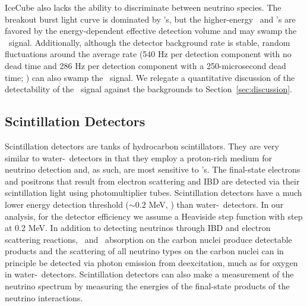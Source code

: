 IceCube also lacks the ability to discriminate between neutrino species.  The 
    breakout burst light curve is dominated by \nue's, but the higher-energy 
    \anue\ and \nux's are favored by the energy-dependent effective detection 
    volume and may swamp the \nue\ signal.  Additionally, although the detector 
    background rate is stable, random fluctuations around the average rate (540 Hz 
    per detection component with no dead time and 286 Hz per detection component 
    with a 250-microsecond dead time; \citealt{abbasietal2011}) can also swamp the 
    \nue\ signal.  We relegate a quantitative discussion of the detectability of 
    the \nue\ signal against the backgrounds to Section~\ref{sec:discussion}.


\subsection{Scintillation Detectors}
Scintillation detectors are tanks of hydrocarbon 
scintillators.  They are very similar to water-\cer\
detectors in that 
they employ a proton-rich medium for neutrino detection 
and, as such, are most sensitive  to
\anue's. The final-state electrons and positrons that result from
electron scattering and IBD are detected via their scintillation light
using photomultiplier tubes. 
 Scintillation detectors have a much lower energy detection threshold  
(${\sim}0.2$ MeV, \citealt{lahaetal2014}) than
 water-\cer\ detectors.  In our analysis, 
for the detector efficiency we assume a Heaviside step function 
with step at 0.2 MeV. In addition to detecting
neutrinos through IBD and electron scattering reactions, \nue\
and \anue\ absorption on the carbon nuclei produce detectable
products and the scattering
of all neutrino types on the carbon nuclei can 
in principle  be detected via photon
emission from deexcitation, much as for oxygen in water-\cer\
detectors.  Scintillation detectors can also make a measurement of the
neutrino spectrum by measuring the energies of the final-state
products of the neutrino interactions.


